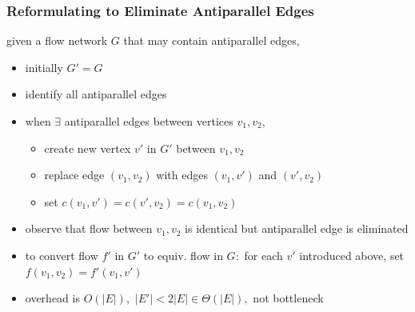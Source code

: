 \documentclass[10pt,aspectratio=169]{beamer}
\begin{document}
\begin{frame} \frametitle{Reformulating to Eliminate Antiparallel Edges}
given a flow network $G$ that may contain antiparallel edges,
\begin{itemize}
  \item initially $G' = G$
  \item identify all antiparallel edges
  \item when $\exists$ antiparallel edges between vertices $v_1, v_2,$
  \begin{itemize}
    \item create new vertex $v'$ in $G'$ between $v_1, v_2$
    \item replace edge $(v_1, v_2)$ with edges $(v_1, v')$ and $(v', v_2)$
    \item set $c(v_1, v')=c(v', v_2)=c(v_1, v_2)$
  \end{itemize}
  \item observe that flow between $v_1, v_2$ is identical but antiparallel
    edge is eliminated
  \item to convert flow $f'$ in $G'$ to equiv. flow in $G:$ for each $v'$
    introduced above, set $f(v_1, v_2) = f'(v_1, v')$
  \item overhead is $O(|E|),$ $|E'| < 2|E| \in \Theta(|E|),$ not bottleneck
\end{itemize}
\end{frame}
\end{document}
